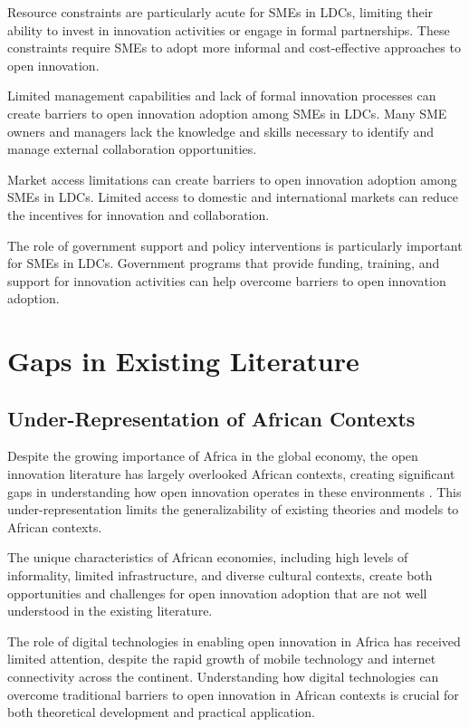 \documentclass[12pt,a4paper]{article}
\begin{document}
Resource constraints are particularly acute for SMEs in LDCs, limiting their ability to invest in innovation activities or engage in formal partnerships. These constraints require SMEs to adopt more informal and cost-effective approaches to open innovation.

Limited management capabilities and lack of formal innovation processes can create barriers to open innovation adoption among SMEs in LDCs. Many SME owners and managers lack the knowledge and skills necessary to identify and manage external collaboration opportunities.

Market access limitations can create barriers to open innovation adoption among SMEs in LDCs. Limited access to domestic and international markets can reduce the incentives for innovation and collaboration.

The role of government support and policy interventions is particularly important for SMEs in LDCs. Government programs that provide funding, training, and support for innovation activities can help overcome barriers to open innovation adoption.

\section{Gaps in Existing Literature}

\subsection{Under-Representation of African Contexts}

Despite the growing importance of Africa in the global economy, the open innovation literature has largely overlooked African contexts, creating significant gaps in understanding how open innovation operates in these environments \cite{adegbite2021open}. This under-representation limits the generalizability of existing theories and models to African contexts.

The unique characteristics of African economies, including high levels of informality, limited infrastructure, and diverse cultural contexts, create both opportunities and challenges for open innovation adoption that are not well understood in the existing literature.

The role of digital technologies in enabling open innovation in Africa has received limited attention, despite the rapid growth of mobile technology and internet connectivity across the continent. Understanding how digital technologies can overcome traditional barriers to open innovation in African contexts is crucial for both theoretical development and practical application.
\end{document}
